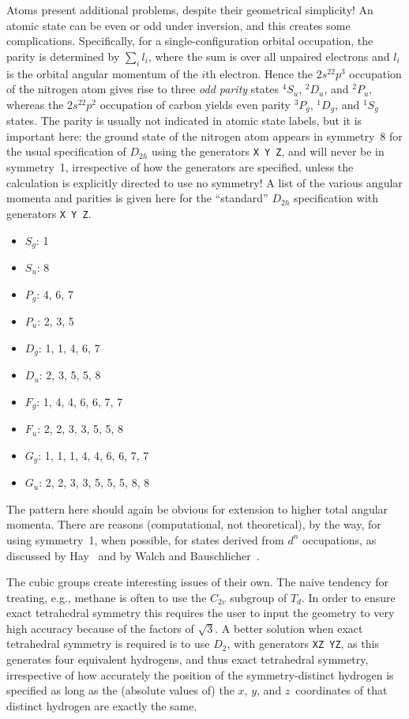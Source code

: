 Atoms present additional problems, despite their geometrical
simplicity!  An atomic state can be even or odd under inversion, and
this creates some complications.  Specifically, for a
single-configuration orbital occupation, the parity is determined by
$\sum_i l_i$, where the sum is over all unpaired electrons and $l_i$
is the orbital angular momentum of the $i$th electron.  Hence the
$2s^22p^3$ occupation of the nitrogen atom gives rise to three
\emph{odd parity} states ${}^4S_u$, ${}^2D_u$, and ${}^2P_u$, whereas
the $2s^22p^2$ occupation of carbon yields even parity ${}^3P_g$,
${}^1D_g$, and ${}^1S_g$ states.  The parity is usually not indicated
in atomic state labels, but it is important here: the ground state of
the nitrogen atom appears in symmetry~8 for the usual specification of
$D_{2h}$ using the generators \verb|X Y Z|,
and will never be in symmetry~1, irrespective of how the
generators are specified, unless the calculation is explicitly
directed to use no symmetry!  A list of the various angular momenta and
parities is given here for the ``standard'' $D_{2h}$ specification
with generators \verb|X Y Z|.
\begin{itemize}
\item $S_g$: 1
\item $S_u$: 8
\item $P_g$: 4, 6, 7
\item $P_u$: 2, 3, 5
\item $D_g$: 1, 1, 4, 6, 7
\item $D_u$: 2, 3, 5, 5, 8
\item $F_g$: 1, 4, 4, 6, 6, 7, 7
\item $F_u$: 2, 2, 3, 3, 5, 5, 8
\item $G_g$: 1, 1, 1, 4, 4, 6, 6, 7, 7
\item $G_u$: 2, 2, 3, 3, 5, 5, 5, 8, 8
\end{itemize}
The pattern here should again be obvious for extension to higher total
angular momenta.  There are reasons (computational, not theoretical),
by the way, for using symmetry~1, when possible, for states derived
from $d^n$ occupations, as discussed by Hay~\cite{Hay77} and by Walch
and Bauschlicher~\cite{Wal83}.

The cubic groups create interesting issues of their own.  The naive
tendency for treating, e.g., methane is often to use the $C_{2v}$
subgroup of $T_d$.  In order to ensure exact tetrahedral symmetry this
requires the user to input the geometry to very high accuracy because
of the factors of $\sqrt{3}$.  A better solution when exact
tetrahedral symmetry is required is to use $D_2$, with generators
\verb|XZ YZ|, as this generates four equivalent hydrogens, and thus
exact tetrahedral symmetry, irrespective of how accurately the
position of the symmetry-distinct hydrogen is specified as long as the
(absolute values of) the $x$, $y$, and $z$~coordinates of that
distinct hydrogen are exactly the same.

